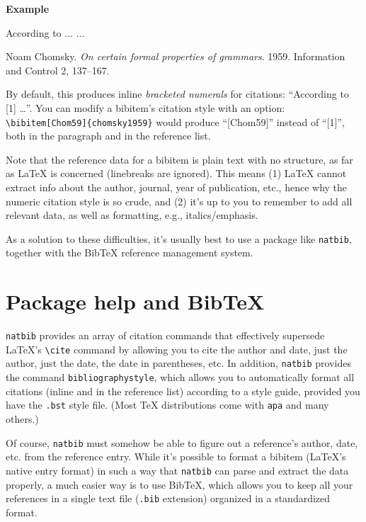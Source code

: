 \documentclass[letterpaper,12pt]{article}
\newcounter{ex-count}
\newenvironment{example}{%
  \quote
  \textbf{Example \arabic{ex-count}}
  \verbatim
}{%
  \endverbatim
  \endquote
  \stepcounter{ex-count}
}
\begin{document}
\begin{example}
According to \cite{chomsky1959} ...
...
\begin{thebibliography}{9}
        Noam Chomsky.
        \emph{On certain formal properties of grammars}.
        1959.
        Information and Control 2, 137--167.
\end{thebibliography}
\end{example}

By default, this produces inline \emph{bracketed numerals} for citations:
``According to [1] \ldots''. You can modify a bibitem's citation style with an
option: \verb-\bibitem[Chom59]{chomsky1959}- would produce ``[Chom59]'' instead
of ``[1]'', both in the paragraph and in the reference list.

Note that the reference data for a bibitem is plain text with no structure, as
far as \LaTeX{} is concerned (linebreaks are ignored). This means (1) \LaTeX{}
cannot extract info about the author, journal, year of publication, etc., hence
why the numeric citation style is so crude, and (2) it's up to you to remember
to add all relevant data, as well as formatting, e.g., italics/emphasis.

As a solution to these difficulties, it's usually best to use a package like
\verb-natbib-, together with the Bib\TeX{} reference management system.


\section{Package help and Bib\TeX{}}

\verb-natbib- provides an array of citation commands that effectively supersede
\LaTeX{}'s \verb-\cite- command by allowing you to cite the author and date,
just the author, just the date, the date in parentheses, etc. In addition,
\verb-natbib- provides the command \verb-bibliographystyle-, which allows you to
automatically format all citations (inline and in the reference list) according
to a style guide, provided you have the \verb-.bst- style file. (Most \TeX{}
distributions come with \verb-apa- and many others.)

Of course, \verb-natbib- must somehow be able to figure out a reference's
author, date, etc. from the reference entry. While it's possible to format a
bibitem (\LaTeX{}'s native entry format) in such a way that \verb-natbib- can
parse and extract the data properly, a much easier way is to use Bib\TeX{},
which allows you to keep all your references in a single text file (\verb-.bib-
extension) organized in a standardized format.
\end{document}
